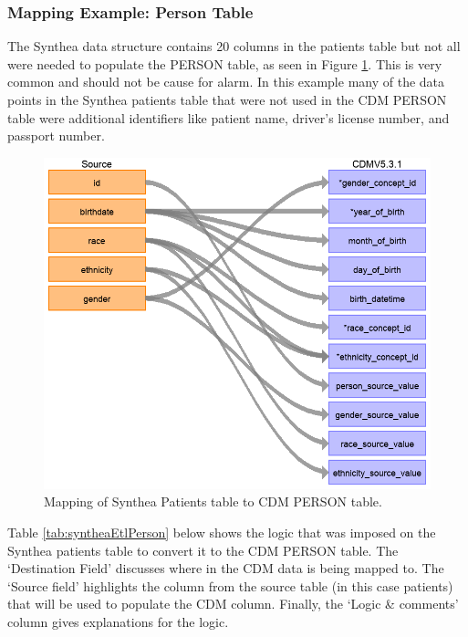 \documentclass[11pt]{book}
\theoremstyle{definition}
\theoremstyle{definition}
\theoremstyle{definition}
\theoremstyle{remark}
\begin{document}
\subsubsection*{Mapping Example: Person
Table}\label{mapping-example-person-table}

The Synthea data structure contains 20 columns in the patients table but
not all were needed to populate the PERSON table, as seen in Figure
\ref{fig:syntheaPerson}. This is very common and should not be cause for
alarm. In this example many of the data points in the Synthea patients
table that were not used in the CDM PERSON table were additional
identifiers like patient name, driver's license number, and passport
number.

\begin{figure}

{\centering \includegraphics[width=1\linewidth]{images/ExtractTransformLoad/syntheaPersonTable} 

}

\caption{Mapping of Synthea Patients table to CDM PERSON table.}\label{fig:syntheaPerson}
\end{figure}

Table \ref{tab:syntheaEtlPerson} below shows the logic that was imposed
on the Synthea patients table to convert it to the CDM PERSON table. The
`Destination Field' discusses where in the CDM data is being mapped to.
The `Source field' highlights the column from the source table (in this
case patients) that will be used to populate the CDM column. Finally,
the `Logic \& comments' column gives explanations for the logic.
\end{document}
